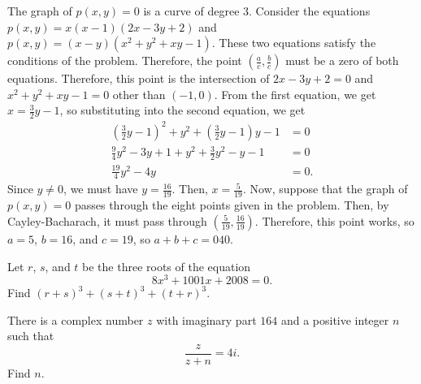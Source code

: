 \documentclass[11pt]{article}
\theoremstyle{definition}
\begin{document}
\begin{solution}[name={Solution by DottedCalculator}]
	The graph of $p(x,y)=0$ is a curve of degree $3$. Consider the equations $p(x,y)=x(x-1)(2x-3y+2)$ and $p(x,y)=(x-y)(x^2+y^2+xy-1)$. These two equations satisfy the conditions of the problem. Therefore, the point $\left(\frac ac,\frac bc\right)$ must be a zero of both equations. Therefore, this point is the intersection of $2x-3y+2=0$ and $x^2+y^2+xy-1=0$ other than $(-1,0)$. From the first equation, we get $x=\frac32y-1$, so substituting into the second equation, we get
	\begin{align*}
		\left(\frac32y-1\right)^2+y^2+\left(\frac32y-1\right)y-1&=0\\
		\frac94y^2-3y+1+y^2+\frac32y^2-y-1&=0\\
		\frac{19}4y^2-4y&=0.\end{align*}Since $y\neq0$, we must have $y=\frac{16}{19}$. Then, $x=\frac5{19}$.
	Now, suppose that the graph of $p(x,y)=0$ passes through the eight points given in the problem. Then, by Cayley-Bacharach, it must pass through $\left(\frac5{19},\frac{16}{19}\right)$. Therefore, this point works, so $a=5$, $b=16$, and $c=19$, so $a+b+c=\boxed{040}$.
\end{solution}






\begin{question}[name={2008 AIME II, \href{https://artofproblemsolving.com/community/c4p1088467}{Problem 7}}]
	Let $ r$, $ s$, and $ t$ be the three roots of the equation
	\[ 8x^3+1001x+2008=0.\]Find $ (r+s)^3+(s+t)^3+(t+r)^3$.
\end{question}


%	













\begin{question}[name={2009 AIME I, \href{https://artofproblemsolving.com/community/c4p1439403}{Problem 2}}]
	There is a complex number $ z$ with imaginary part $ 164$ and a positive integer $ n$ such that
	\[ \frac {z}{z + n} = 4i.
	\]Find $ n$.
\end{question}


%	
\end{document}
